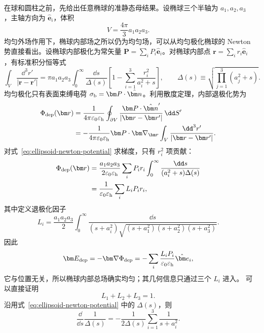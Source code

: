 在球和圆柱之前，先给出任意椭球的准静态母结果。设椭球三个半轴为 $a_1,a_2,a_3$，主轴方向为 $\hat{\bm e}_i$，体积
\begin{equation}
 V=\frac{4\pi}{3}a_1a_2a_3.
\end{equation}
均匀外场作用下，椭球内部场之所以仍为均匀场，可以从均匀极化椭球的 Newton 势直接看出。设椭球内部极化为常矢量
$\bm P=\sum_iP_i\hat{\bm e}_i$。对椭球内部点 $\bm r=\sum_i r_i\hat{\bm e}_i$，有标准积分恒等式
\begin{equation}
\int_V\frac{\dd^3r'}{|\bm r-\bm r'|}
=\pi a_1a_2a_3
\int_0^\infty\frac{\dd s}{\Delta(s)}
\left[1-\sum_{i=1}^3\frac{r_i^2}{a_i^2+s}\right],
\qquad
\Delta(s)\equiv\sqrt{\prod_{j=1}^3(a_j^2+s)}.
\label{eq:ellipsoid-newton-potential}
\end{equation}
均匀极化只有表面束缚电荷 $\sigma_{\rm b}=\bm P\cdot\hat{\bm n}$。利用散度定理，内部退极化势为
\begin{align}
\Phi_{\rm dep}(\bm r)
&=\frac{1}{4\pi\varepsilon_0\varepsilon_{\rm h}}
\oint_{\partial V}\frac{\bm P\cdot\hat{\bm n}'}{|\bm r-\bm r'|}\,\dd S'\\
&=-\frac{1}{4\pi\varepsilon_0\varepsilon_{\rm h}}
\bm P\cdot\bm\nabla_{\bm r}
\int_V\frac{\dd^3r'}{|\bm r-\bm r'|}.
\end{align}
对式~\eqref{eq:ellipsoid-newton-potential} 求梯度，只有 $r_i^2$ 项贡献：
\begin{align}
\Phi_{\rm dep}(\bm r)
&=\frac{a_1a_2a_3}{2\varepsilon_0\varepsilon_{\rm h}}
\sum_iP_ir_i
\int_0^\infty
\frac{\dd s}{(a_i^2+s)\Delta(s)}\\
&=\frac{1}{\varepsilon_0\varepsilon_{\rm h}}
\sum_iL_iP_ir_i,
\end{align}
其中定义退极化因子
\begin{equation}
 \boxed{
 L_i=\frac{a_1a_2a_3}{2}
 \int_0^\infty
 \frac{\dd s}
 {(s+a_i^2)
 \sqrt{(s+a_1^2)(s+a_2^2)(s+a_3^2)}}.}
 \label{eq:ellipsoid-depolarization}
\end{equation}
因此
\begin{equation}
\bm E_{\rm dep}=-\bm\nabla\Phi_{\rm dep}
=-\sum_i\frac{L_iP_i}{\varepsilon_0\varepsilon_{\rm h}}\hat{\bm e}_i,
\end{equation}
它与位置无关，所以椭球内部总场确实均匀；其几何信息只通过三个 $L_i$ 进入。
可以直接证明
\begin{equation}
 L_1+L_2+L_3=1.
 \label{eq:ellipsoid-L-sum}
\end{equation}
沿用式~\eqref{eq:ellipsoid-newton-potential} 中的 $\Delta(s)$，则
\begin{equation}
 \frac{\dd}{\dd s}\frac{1}{\Delta(s)}
 =-\frac{1}{2\Delta(s)}
 \sum_{i=1}^3\frac{1}{s+a_i^2}.
\end{equation}

